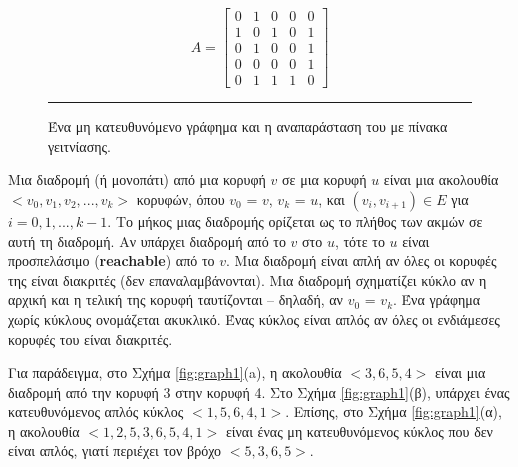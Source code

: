 \documentclass[12pt,a4paper]{article}
\begin{document}
\begin{figure}[ht]
\centering

\begin{minipage}{0.45\textwidth}
\centering
{}
\end{minipage}
\hfill
\begin{minipage}{0.45\textwidth}
\centering
\[
A =
\begin{bmatrix}
0 & 1 & 0 & 0 & 0 \\
1 & 0 & 1 & 0 & 1 \\
0 & 1 & 0 & 0 & 1 \\
0 & 0 & 0 & 0 & 1 \\
0 & 1 & 1 & 1 & 0 
\end{bmatrix}
\]

\end{minipage}

\vspace{0.3cm}
\noindent\rule{\textwidth}{0.2pt}
\caption{Ένα μη κατευθυνόμενο γράφημα και η αναπαράσταση του με πίνακα γειτνίασης.}
\label{fig:graph2}
\end{figure}
\vspace{0.5cm}


Μια διαδρομή (ή μονοπάτι) από μια κορυφή $v$ σε μια κορυφή $u$ είναι μια ακολουθία $<v_0, v_1, v_2, ..., v_k>$ κορυφών, όπου $v_0$ = $v$, $v_k$ = $u$, και $(v_i, v_{i+1}) \in E$ για $i = 0, 1, ..., k-1$. Το μήκος μιας διαδρομής ορίζεται ως το πλήθος των ακμών σε αυτή τη διαδρομή. Αν υπάρχει διαδρομή από το $v$ στο $u$, τότε το $u$ είναι προσπελάσιμο (\textbf{\foreignlanguage{english}{reachable}}) από το $v$. Μια διαδρομή είναι απλή αν όλες οι κορυφές της είναι διακριτές (δεν επαναλαμβάνονται). Μια διαδρομή σχηματίζει κύκλο αν η αρχική και η τελική της κορυφή ταυτίζονται – δηλαδή, αν $v_0$ = $v_k$. Ένα γράφημα χωρίς κύκλους ονομάζεται ακυκλικό. Ένας κύκλος είναι απλός αν όλες οι ενδιάμεσες κορυφές του είναι διακριτές.


Για παράδειγμα, στο Σχήμα \ref{fig:graph1}(a), η ακολουθία $<3, 6, 5, 4>$ είναι μια διαδρομή από την κορυφή 3 στην κορυφή 4. Στο Σχήμα \ref{fig:graph1}(β), υπάρχει ένας κατευθυνόμενος απλός κύκλος $<1, 5, 6, 4, 1>$. Επίσης, στο Σχήμα \ref{fig:graph1}(α), η ακολουθία $<1, 2, 5, 3, 6, 5, 4, 1>$ είναι ένας μη κατευθυνόμενος κύκλος που δεν είναι απλός, γιατί περιέχει τον βρόχο $<5, 3, 6, 5>$.
\end{document}
